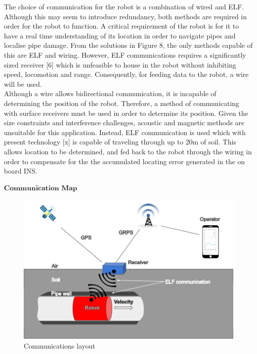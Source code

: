 \documentclass[11pt]{article}		%
\begin{document}
        
        The choice of communication for the robot is a combination of wired and ELF. Although this may seem to introduce redundancy, both methods are required in order for the robot to function.
         A critical requirement of the robot is for it to have a real time understanding of its location in order to navigate pipes and localise pipe damage. From the solutions in Figure 8, the only methods capable of this are ELF and wiring. However, ELF communications requires a significantly sized receiver [6] which is unfeasible to house in the robot without inhibiting speed, locomotion and range. Consequently, for feeding data to the robot, a wire will be used.\\ 
         Although a wire allows bidirectional communication, it is incapable of determining the position of the robot. Therefore, a method of communicating with surface receivers must be used in order to determine its position. Given the size constraints and interference challenges, acoustic and magnetic methods are unsuitable for this application. Instead, ELF communication is used which with present technology [x] is capable of traveling through up to 20m of soil. This allows location to be determined, and fed back to the robot through the wiring in order to compensate for the the accumulated locating error generated in the on board INS.

         
        $\textbf{Communication Map}$
        
        \begin{figure}[h]
			\centering
			\includegraphics[scale=1]{COMMS.pdf}
			\caption{Communications layout}
			\label{comparison comms}
		\end{figure}
\end{document}
